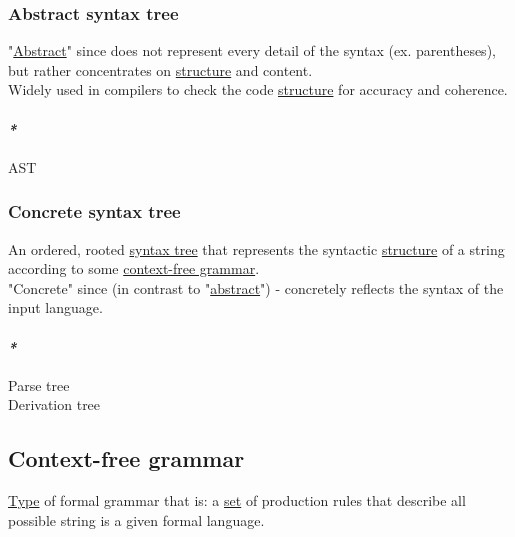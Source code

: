 \documentclass[11pt]{article}
\begin{document}
\subsubsection{\label{org971a316}Abstract syntax tree}
\label{sec:org0b8f851}
"\hyperref[orgbbe9132]{Abstract}" since does not represent every detail of the syntax (ex. parentheses), but rather concentrates on \hyperref[org8051f61]{structure} and content.\\

Widely used in compilers to check the code \hyperref[org8051f61]{structure} for accuracy and coherence.\\

\paragraph{\emph{*}}
\label{sec:orgdcf0a33}

\label{org7efa20f}AST\\

\subsubsection{\label{org327423a}Concrete syntax tree}
\label{sec:org9fd191e}

An ordered, rooted \hyperref[orgda43e7b]{syntax tree} that represents the syntactic \hyperref[org8051f61]{structure} of a string according to some \hyperref[org9a94296]{context-free grammar}.\\

"Concrete" since (in contrast to "\hyperref[orgbbe9132]{abstract}") - concretely reflects the syntax of the input language.\\

\paragraph{\emph{*}}
\label{sec:orgaf48c4f}

\label{org3d54b36}Parse tree\\
\label{org294b569}Derivation tree\\

\subsection{\label{org9a94296}Context-free grammar}
\label{sec:org4d9e8c5}
\hyperref[orgc4aea2f]{Type} of formal grammar that is: a \hyperref[org1faf06d]{set} of production rules that describe all possible string is a given formal language.\\
\end{document}

